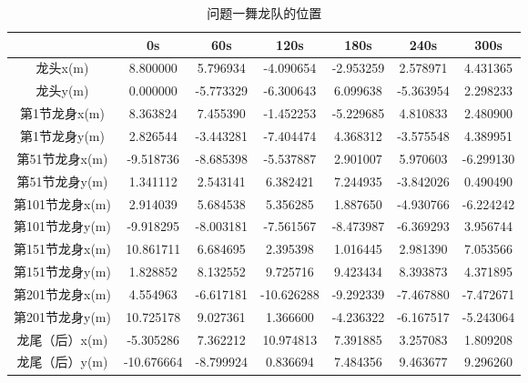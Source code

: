 \documentclass[withoutpreface,bwprint]{cumcmthesis} %
\begin{document}
	\begin{table}[H]
		\centering
		\setlength{\tabcolsep}{8pt}
		\caption{问题一舞龙队的位置} 
		\label{问题一位置} 
		\setlength\extrarowheight{-3pt}
		\small
		\begin{tabular}{|c|c|c|c|c|c|c|}
			\hline
			& 0s       &    60s      & 120s & 180s & 240s & 300s \\ \hline
			龙头x(m)     & 8.800000 &   5.796934  & -4.090654 &-2.953259&2.578971& 4.431365\\ \hline
			龙头y(m)      &   0.000000     &  -5.773329  & -6.300643&6.099638 &-5.363954& 2.298233\\ \hline
			第1节龙身x(m)  & 8.363824 &  7.455390   &-1.452253 & -5.229685 &4.810833& 2.480900     \\ \hline
			第1节龙身y(m)  & 2.826544 & -3.443281  & -7.404474& 4.368312 &-3.575548 & 4.389951     \\ \hline
			第51节龙身x(m) & -9.518736 & -8.685398 &-5.537887&2.901007 &5.970603&-6.299130 \\ \hline
			第51节龙身y(m) & 1.341112   & 2.543141 & 6.382421 &7.244935& -3.842026 & 0.490490     \\ \hline
			第101节龙身x(m) & 2.914039   & 5.684538 & 5.356285&1.887650 &-4.930766&  -6.224242    \\ \hline
			第101节龙身y(m) &  -9.918295 & -8.003181&-7.561567 &-8.473987 &-6.369293& 3.956744     \\ \hline
			第151节龙身x(m) &  10.861711 & 6.684695 & 2.395398&1.016445& 2.981390& 7.053566     \\ \hline
			第151节龙身y(m) & 1.828852   & 8.132552 & 9.725716&9.423434 &8.393873& 4.371895     \\ \hline
			第201节龙身x(m) &  4.554963  & -6.617181 &-10.626288 &-9.292339&-7.467880 & -7.472671     \\ \hline
			第201节龙身y(m) & 10.725178  & 9.027361 & 1.366600 &-4.236322&-6.167517& -5.243064     \\ \hline
			龙尾（后）x(m) & -5.305286   & 7.362212 &10.974813 &7.391885& 3.257083& 1.809208     \\ \hline
			龙尾（后）y(m) & -10.676664  & -8.799924&0.836694&7.484356 &9.463677& 9.296260   \\ \hline
		\end{tabular}
	\end{table}
	\vspace{-0.5cm} 
\end{document}
